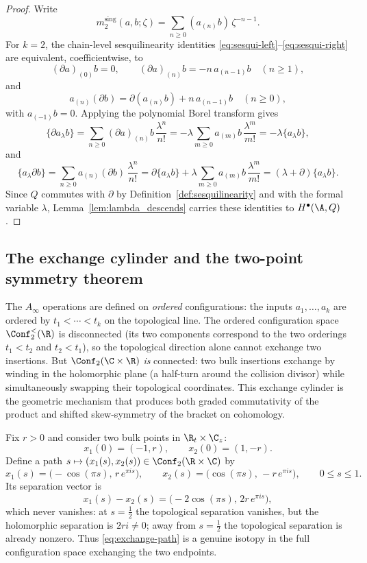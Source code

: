 \begin{proof}
Write
\[
m_2^{\mathrm{sing}}(a,b;\zeta)
=\sum_{n\ge0}(a_{(n)}b)\,\zeta^{-n-1}.
\]
For \(k=2\), the chain-level sesquilinearity identities
\eqref{eq:sesqui-left}--\eqref{eq:sesqui-right} are equivalent,
coefficientwise, to
\[
(\partial a)_{(0)}b=0,\qquad
(\partial a)_{(n)}b=-n\,a_{(n-1)}b\quad(n\ge1),
\]
and
\[
a_{(n)}(\partial b)=\partial(a_{(n)}b)+n\,a_{(n-1)}b
\quad(n\ge0),
\]
with \(a_{(-1)}b=0\). Applying the polynomial Borel transform gives
\[
\{\partial a_\lambda b\}
=\sum_{n\ge0}(\partial a)_{(n)}b\,\frac{\lambda^n}{n!}
=-\lambda\sum_{m\ge0}a_{(m)}b\,\frac{\lambda^m}{m!}
=-\lambda\{a_\lambda b\},
\]
and
\[
\{a_\lambda\partial b\}
=\sum_{n\ge0}a_{(n)}(\partial b)\,\frac{\lambda^n}{n!}
=\partial\{a_\lambda b\}
+ \lambda\sum_{m\ge0}a_{(m)}b\,\frac{\lambda^m}{m!}
=(\lambda+\partial)\{a_\lambda b\}.
\]
Since \(Q\) commutes with \(\partial\) by
Definition~\ref{def:sesquilinearity} and with the formal variable
\(\lambda\), Lemma~\ref{lem:lambda_descends} carries these identities
to \(H^\bullet(\A,Q)\).
\end{proof}

\subsection{The exchange cylinder and the two-point symmetry theorem}

The $A_\infty$ operations are defined on \emph{ordered} configurations:
the inputs $a_1, \ldots, a_k$ are ordered by $t_1 < \cdots < t_k$
on the topological line. The ordered configuration space
$\Conf_2^{<}(\R)$ is disconnected (its two components correspond
to the two orderings $t_1 < t_2$ and $t_2 < t_1$), so the
topological direction alone cannot exchange two insertions. But
$\Conf_2(\C \times \R)$ \emph{is} connected: two bulk insertions
exchange by winding in the holomorphic plane (a half-turn around the
collision divisor) while simultaneously swapping their topological
coordinates. This exchange cylinder is the geometric mechanism that
produces both graded commutativity of the product and shifted
skew-symmetry of the bracket on cohomology.

\begin{construction}
\label{const:exchange-cylinder}
Fix $r>0$ and consider two bulk points in $\R_t\times\C_z$:
\[
x_1(0)=(-1,r),\qquad x_2(0)=(1,-r).
\]
Define a path $s\mapsto (x_1(s),x_2(s))\in \Conf_2(\R\times\C)$ by
\begin{equation}
\label{eq:exchange-path}
x_1(s)=\bigl(-\cos(\pi s),\,r\,e^{\pi i s}\bigr),
\qquad
x_2(s)=\bigl(\cos(\pi s),\,-r\,e^{\pi i s}\bigr),
\qquad 0\le s\le1.
\end{equation}
Its separation vector is
\[
x_1(s)-x_2(s)=\bigl(-2\cos(\pi s),\,2r\,e^{\pi i s}\bigr),
\]
which never vanishes: at $s=\tfrac12$ the topological separation vanishes, but the
holomorphic separation is $2ri\neq0$; away from $s=\tfrac12$ the topological separation
is already nonzero. Thus \eqref{eq:exchange-path} is a genuine isotopy in the full
configuration space exchanging the two endpoints.
\end{construction}

